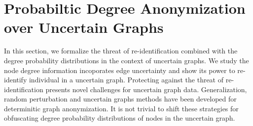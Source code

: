 \chapter{Probabiltic Degree Anonymization over Uncertain Graphs}
\label{chp:e}
In this section, we formalize the threat of re-identification combined with the degree probability distributions in the context of uncertain graphs. We study the node degree information incoporates edge uncertainty and show its power to re-identify individual in a uncertain graph. Protecting against the threat of re-identification presents novel challenges for uncertain graph data. Generalization, random perturbation and uncertain graphs methods have been developed for determinitic graph anonymization. It is not trivial to shift these strategies for obfuscating degree probability distributions of nodes in the uncertain graph. 

% 


